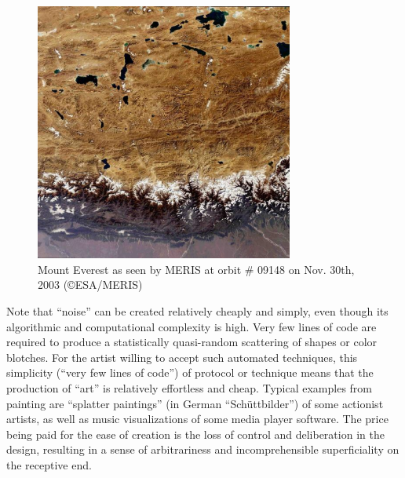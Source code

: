 \documentclass[%
 reprint,
 showpacs,
 showkeys,
 amsmath,
 amssymb,
 aps,
 pra,
 longbibliography,
 floatfix,
 ]{revtex4-1}
\begin{document}
\begin{figure}
\centerline{\includegraphics[width=8.5cm]{2008-ae-China_MountEverest_MER_FR_Orbit09148_20031130_hires_s}}
   \caption{Mount Everest as seen by MERIS at orbit \# 09148 on Nov. 30th, 2003
(\copyright ESA/MERIS)}
   \label{2005-ae-China_MountEverest_MER_FR_Orbit09148_20031130_hires}
 \end{figure}





Note that ``noise'' can be created relatively cheaply and simply, even though its algorithmic and computational complexity is high.
Very few lines of code are required to produce a statistically quasi-random scattering of shapes or color blotches.
For the artist willing to accept such automated techniques, this simplicity (``very few lines of code'') of protocol or technique means that the production of ``art'' is relatively effortless and cheap.
Typical examples from painting are ``splatter paintings'' (in German ``Sch\"uttbilder'') of some actionist artists,
as well as music visualizations of some media player software.
The price being paid for the ease of creation is the loss of control and deliberation in the design, resulting in a sense of arbitrariness and incomprehensible superficiality on the receptive end.
\end{document}
